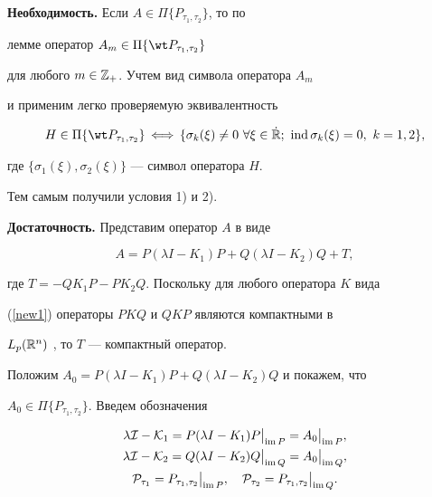 \begin{pf}


{\bf Необходимость.} Если $A\in\Pi\{P_{\tau_1,\tau_2}\}$, то по


лемме оператор $A_m\in\Pi\{\wt P_{\tau_1,\tau_2}\}$


для любого $m\in{\Bbb Z}_+$. Учтем вид символа оператора $A_m$


и применим легко проверяемую эквивалентность


$$


H\in\Pi\{\wt P_{\tau_1,\tau_2}\}\,\Longleftrightarrow\,


\{\sigma_k(\xi)\ne0\ \forall\xi\in\Dot{\Bbb R};


\ \ind\sigma_k(\xi)=0,\ k=1,2\},


$$


где $\{\sigma_1(\xi),\sigma_2(\xi)\}$ --- символ оператора $H$.


Тем самым получили условия 1) и 2).


\smallskip





{\bf Достаточность.} Представим оператор $A$ в виде


$$


A=P(\lambda I-K_1)P+Q(\lambda I-K_2)Q+T,


$$


где $T=-QK_1P-PK_2Q$. Поскольку для любого оператора $K$ вида


(\ref{new1}) операторы $PKQ$ и $QKP$ являются компактными в


$L_p({\Bbb R}^n)$ \cite{b4}, то $T$ --- компактный оператор.


Положим $A_0=P(\lambda I-K_1)P+ Q(\lambda I-K_2)Q$ и покажем, что


$A_0\in\Pi\{P_{\tau_1,\tau_2}\}$. Введем обозначения


\begin{gather*}


\lambda{\cal I}-{\cal K}_1= P(\lambda I-K_1)P\big|_{\imm P}=


A_0\big|_{\imm P},\\


\lambda{\cal I}-{\cal K}_2= Q(\lambda I-K_2)Q\big|_{\imm Q}=


A_0\big|_{\imm Q},\\


{\cal P}_{\tau_1}=P_{\tau_1,\tau_2}\big|_{\imm P}, \quad


{\cal P}_{\tau_2}=P_{\tau_1,\tau_2}\big|_{\imm Q}.



\end{gather*}
\end{pf}
